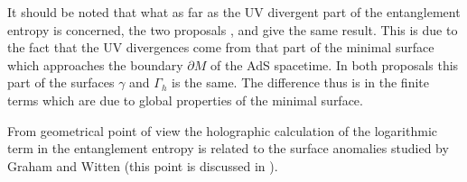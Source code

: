 \documentclass[12pt]{article}
\begin{document}
It should be noted that what as far as the UV divergent part of the entanglement entropy is concerned, the two proposals \cite{Emparan:2006ni}, \cite{Iwashita:2006zj} and \cite{Solodukhin:2006xv}
give the same result. This is due to the fact that the UV divergences come from that part of the minimal surface which approaches the boundary $\partial M$ of the AdS spacetime.
In both proposals this part of the surfaces $\gamma$ and $\Gamma_h$  is the same. The difference thus is in the finite terms which are due to global properties of the minimal surface.

From  geometrical point of view  the holographic calculation of the logarithmic term in the entanglement entropy
 is related to the surface anomalies studied
by Graham and Witten \cite{Graham:1999pm}  (this point is discussed in \cite{Schwimmer:2008yh}).
\end{document}
